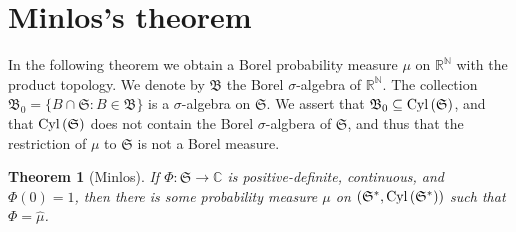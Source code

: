 \documentclass{article}
\newcommand{\Cyl}{\ensuremath\mathrm{Cyl}\,}
\newtheorem{theorem}{Theorem}
\theoremstyle{definition}
\begin{document}
\section{Minlos's theorem}
In the following theorem we obtain a Borel probability measure $\mu$ on $\mathbb{R}^\mathbb{N}$ with the product topology. We denote
by $\mathfrak{B}$ the Borel
$\sigma$-algebra of $\mathbb{R}^\mathbb{N}$. The collection $\mathfrak{B}_0=\{B \cap \mathfrak{S}: B \in \mathfrak{B}\}$  is a $\sigma$-algebra
on $\mathfrak{S}$. We assert that $\mathfrak{B}_0 \subseteq \Cyl(\mathfrak{S})$, and that $\Cyl(\mathfrak{S})$ does not contain the Borel $\sigma$-algbera of $\mathfrak{S}$,
and thus that the restriction of $\mu$ to $\mathfrak{S}$ is not a Borel measure. 


\begin{theorem}[Minlos]
If $\Phi:\mathfrak{S} \to \mathbb{C}$ is positive-definite, continuous, and $\Phi(0)=1$, then there is some probability measure $\mu$
on $(\mathfrak{S}^*,\Cyl(\mathfrak{S}^*))$ such that $\Phi=\hat{\mu}$.
\end{theorem}
\end{document}
